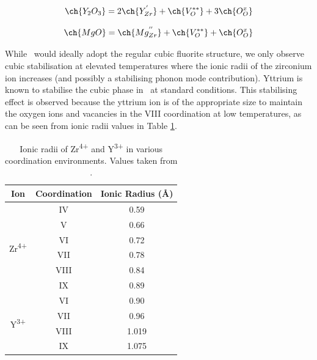 \begin{equation}
\ch{Y_{2}O_{3}} = 2\ch{Y_{Zr}^{'}} + \ch{V_{O}^{**}} + 3\ch{O_{O}^{x}} 
\label{equation:YSZ}
\end{equation}

\begin{equation}
\ch{MgO} = \ch{Mg_{Zr}^{''}} + \ch{V_{O}^{**}} + \ch{O_{O}^{x}} 
\label{equation:mg_stabilised_zro2}
\end{equation}

While \zirconia\ would ideally adopt the regular cubic fluorite structure, we only observe cubic stabilisation at elevated temperatures where the ionic radii of the zirconium ion increases (and possibly a stabilising phonon mode contribution). Yttrium is known to stabilise the cubic phase in \zirconia\ at standard conditions. This stabilising effect is observed because the yttrium ion is of the appropriate size to maintain the oxygen ions and vacancies in the VIII coordination at low temperatures, as can be seen from ionic radii values in Table \ref{figure:ionicradii}. 


\begin{table}[htp]
\onehalfspacing
\centering
\caption[Ionic radii of Zr\textsuperscript{4+} and Y\textsuperscript{3+} in various coordination environments.]{Ionic radii of Zr\textsuperscript{4+} and Y\textsuperscript{3+} in various coordination environments. Values taken from \cite{Shannon1976}.}
\label{figure:ionicradii}
\begin{tabular}{ccc}
\hline
Ion & Coordination & Ionic Radius (\r{A}) \\ \hline
\multicolumn{1}{c}{\multirow{6}{*}{Zr\textsuperscript{4+}}} & \multicolumn{1}{c}{IV} & 0.59 \\
\multicolumn{1}{c}{} & \multicolumn{1}{c}{V} & 0.66 \\
\multicolumn{1}{c}{} & \multicolumn{1}{c}{VI} & 0.72 \\
\multicolumn{1}{c}{} & \multicolumn{1}{c}{VII} & 0.78 \\
\multicolumn{1}{c}{} & \multicolumn{1}{c}{VIII} & 0.84 \\
\multicolumn{1}{c}{} & \multicolumn{1}{c}{IX} & 0.89 \\ \hline
\multicolumn{1}{c}{\multirow{4}{*}{Y\textsuperscript{3+}}} & \multicolumn{1}{c}{VI} & 0.90 \\
\multicolumn{1}{c}{} & \multicolumn{1}{c}{VII} & 0.96 \\
\multicolumn{1}{c}{} & \multicolumn{1}{c}{VIII} & 1.019 \\
\multicolumn{1}{c}{} & \multicolumn{1}{c}{IX} & 1.075 \\ \hline
\end{tabular}
\end{table}


